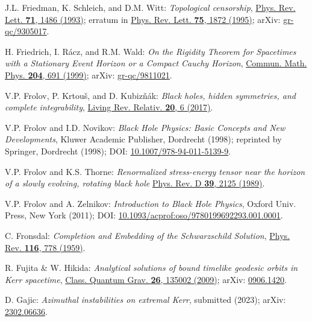 \begin{thebibliography}{123}
J.L. Friedman, K. Schleich, and D.M. Witt:
{\em Topological censorship},
\href{https://doi.org/10.1103/PhysRevLett.71.1486}{Phys. Rev. Lett. {\bf 71}, 1486 (1993)}; erratum in \href{https://doi.org/10.1103/PhysRevLett.75.1872}{Phys. Rev. Lett. {\bf 75}, 1872 (1995)};
arXiv: \href{https://arxiv.org/abs/gr-qc/9305017}{gr-qc/9305017}.

H. Friedrich, I. Rácz, and R.M. Wald:
{\em On the Rigidity Theorem for Spacetimes with a Stationary Event Horizon or a Compact Cauchy Horizon},
\href{https://doi.org/10.1007/s002200050662}{Commun. Math. Phys. {\bf 204}, 691 (1999)};
arXiv: \href{https://arxiv.org/abs/gr-qc/9811021}{gr-qc/9811021}.

V.P. Frolov, P. Krtouš, and D. Kubizňák:
{\em Black holes, hidden symmetries, and complete integrability},
\href{https://doi.org/10.1007/s41114-017-0009-9}{Living Rev. Relativ. {\bf 20}, 6 (2017)}.

V.P. Frolov and I.D. Novikov:
{\em Black Hole Physics: Basic Concepts and New Developments},
Kluwer Academic Publisher, Dordrecht (1998); reprinted by
Springer, Dordrecht (1998);
DOI: \href{https://doi.org/10.1007/978-94-011-5139-9}{10.1007/978-94-011-5139-9}.

V.P. Frolov and K.S. Thorne:
{\em Renormalized stress-energy tensor near the horizon of a slowly evolving, rotating black hole}
\href{https://doi.org/10.1103/PhysRevD.39.2125}{Phys. Rev. D {\bf 39}, 2125 (1989)}.

V.P. Frolov and A. Zelnikov:
{\em Introduction to Black Hole Physics},
Oxford Univ. Press, New York (2011);
DOI: \href{https://doi.org/10.1093/acprof:oso/9780199692293.001.0001}{10.1093/acprof:oso/9780199692293.001.0001}.

C. Fronsdal: {\em Completion and Embedding of the Schwarzschild Solution},
\href{https://doi.org/10.1103/PhysRev.116.778}{Phys. Rev. {\bf 116}, 778 (1959)}.

R. Fujita \& W. Hikida:
{\em Analytical solutions of bound timelike geodesic orbits in Kerr spacetime},
\href{https://doi.org/10.1088/0264-9381/26/13/135002}{Class. Quantum Grav. {\bf 26}, 135002 (2009)};
arXiv: \href{https://arxiv.org/abs/0906.1420}{0906.1420}.

D. Gajic:
{\em Azimuthal instabilities on extremal Kerr},
submitted (2023);
arXiv: \href{https://arxiv.org/abs/2302.06636}{2302.06636}.


\end{thebibliography}
